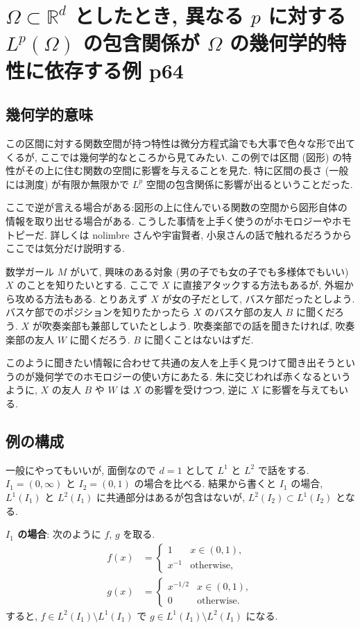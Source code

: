\documentclass[openany, a4paper, oneside]{jsbook}
\theoremstyle{break}
\theoremstyle{breakdefn}
\begin{document}
\section{$\Omega \subset \mathbb{R}^d$ としたとき, 異なる $p$ に対する $L^p (\Omega)$ の包含関係が $\Omega$ の幾何学的特性に依存する例 \cite{DavidWilliams1} p64}

\subsection{幾何学的意味}


この区間に対する関数空間が持つ特性は微分方程式論でも大事で色々な形で出てくるが, ここでは幾何学的なところから見てみたい.
この例では区間 (図形) の特性がその上に住む関数の空間に影響を与えることを見た.
特に区間の長さ (一般には測度) が有限か無限かで $L^p$ 空間の包含関係に影響が出るということだった.

ここで逆が言える場合がある:図形の上に住んでいる関数の空間から図形自体の情報を取り出せる場合がある.
こうした事情を上手く使うのがホモロジーやホモトピーだ.
詳しくは nolimbre さんや宇宙賢者, 小泉さんの話で触れるだろうからここでは気分だけ説明する.

数学ガール $M$ がいて, 興味のある対象 (男の子でも女の子でも多様体でもいい) $X$ のことを知りたいとする.
ここで $X$ に直接アタックする方法もあるが, 外堀から攻める方法もある.
とりあえず $X$ が女の子だとして, バスケ部だったとしよう.
バスケ部でのポジションを知りたかったら $X$ のバスケ部の友人 $B$ に聞くだろう.
$X$ が吹奏楽部も兼部していたとしよう.
吹奏楽部での話を聞きたければ, 吹奏楽部の友人 $W$ に聞くだろう.
$B$ に聞くことはないはずだ.

このように聞きたい情報に合わせて共通の友人を上手く見つけて聞き出そうというのが幾何学でのホモロジーの使い方にあたる.
朱に交じわれば赤くなるというように, $X$ の友人 $B$ や $W$ は $X$ の影響を受けつつ, 逆に $X$ に影響を与えてもいる.
\subsection{例の構成}


一般にやってもいいが, 面倒なので $d = 1$ として $L^1$ と $L^2$ で話をする.
$I_1 = (0, \infty)$ と $I_2 = (0, 1)$ の場合を比べる.
結果から書くと $I_1$ の場合, $L^1 (I_1)$ と $L^2 (I_1)$ に共通部分はあるが包含はないが, $L^2 (I_2) \subset L^1 (I_2)$ となる.

\textbf{$I_1$ の場合}:
次のように $f$, $g$ を取る.
\begin{align}
 f (x)
 &=
 \begin{cases}
  1      & x \in (0, 1), \\
  x^{-1} & \mathrm{otherwise},
 \end{cases} \\
 g (x)
 &=
 \begin{cases}
  x^{-1/2} & x \in (0,1), \\
  0        & \mathrm{otherwise}.
 \end{cases}
\end{align}
すると, $f \in L^2 (I_1) \setminus L^1 (I_1)$ で $g \in L^1 (I_1) \setminus L^2 (I_1)$ になる.
\end{document}
